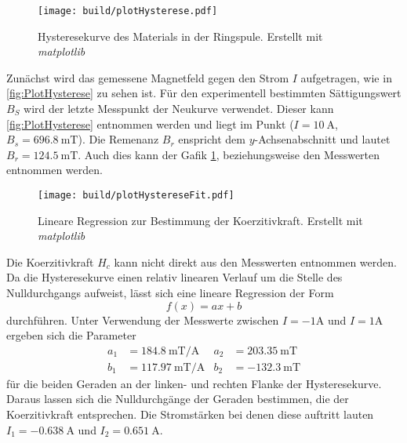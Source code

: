 \begin{figure}
    \centering
    \caption{Hysteresekurve des Materials in der Ringspule. Erstellt mit \textit{matplotlib} \cite{matplotlib}}
    \label{fig:PlotHysterese}
    \texttt{[image: build/plotHysterese.pdf]}
\end{figure}

Zunächst wird das gemessene Magnetfeld gegen den Strom $I$ aufgetragen, wie in \autoref{fig:PlotHysterese} zu sehen ist. Für den experimentell bestimmten
Sättigungswert $B_S$ wird der letzte Messpunkt der Neukurve verwendet. Dieser kann \autoref{fig:PlotHysterese} entnommen werden und
liegt im Punkt ($I = 10\:\unit{\ampere}$, $B_s = 696.8\:\unit{\milli\tesla}$).
Die Remenanz $B_r$ enspricht dem $y$-Achsenabschnitt und lautet $ B_r = 124.5 \:\unit{\milli\tesla}$. Auch dies kann der Gafik \ref{fig:PlotHysterese},
beziehungsweise den Messwerten entnommen werden.
\begin{figure}
    \centering
    \caption{Lineare Regression zur Bestimmung der Koerzitivkraft. Erstellt mit \textit{matplotlib} \cite{matplotlib}}
    \label{fig:PlotHystereseFit}
    \texttt{[image: build/plotHystereseFit.pdf]}
\end{figure}
Die Koerzitivkraft $H_c$ kann nicht direkt aus den Messwerten entnommen werden. Da die Hysteresekurve einen relativ linearen Verlauf um die Stelle des Nulldurchgangs 
aufweist, lässt sich eine lineare Regression der Form
\begin{equation*}
    f(x) = ax + b
\end{equation*}
durchführen. Unter Verwendung der Messwerte zwischen $I = -1 \unit{\ampere}$ und $I = 1 \unit{\ampere}$ ergeben sich die Parameter
\begin{align*}
    a_1 &= 184.8 \: \unit{\milli\tesla\per\ampere}    &   a_2 &= 203.35\: \unit{\milli\tesla}   \\  
    b_1 &= 117.97\: \unit{\milli\tesla\per\ampere}    &   b_2 &= -132.3\: \unit{\milli\tesla}
\end{align*}
für die beiden Geraden an der linken- und rechten Flanke der Hysteresekurve. Daraus lassen sich die Nulldurchgänge der Geraden bestimmen, die der Koerzitivkraft entsprechen. 
Die Stromstärken bei denen diese auftritt lauten $I_1 = -0.638 \: \unit{\ampere}$ und $I_2 = 0.651 \: \unit{\ampere}$.
